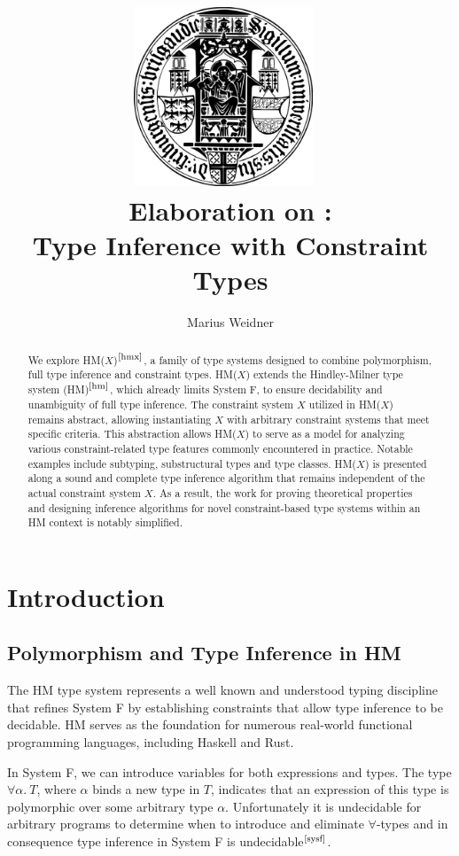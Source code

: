 \documentclass[runningheads]{llncs}
\title{\includegraphics[width=0.4\textwidth]{logo.png}~\\[1cm] Elaboration on
  \hmx:\\Type Inference with Constraint Types}
\institute{Chair of Programming Languages, University of Freiburg \\
  \email{weidner@cs.uni-freiburg.de}}
\author{Marius Weidner}
\newcommand{\hmx}{HM($X$)}
\begin{document}
\let\oldaddcontentsline\addcontentsline{}
\def\addcontentsline#1#2#3{}
\maketitle
\def\addcontentsline#1#2#3{\oldaddcontentsline{#1}{#2}{#3}}

\begin{abstract}
  We explore \hmx{}$^\text{\cite{hmx}}$, a family of type systems designed to
  combine
  polymorphism, full type inference and constraint types.
  \hmx{} extends the Hindley-Milner type system (HM)$^\text{\cite{hm}}$, which
  already
  limits
  System F, to ensure decidability and unambiguity of full type inference.
  The constraint system $X$ utilized in \hmx{} remains abstract, allowing
  instantiating $X$ with arbitrary constraint systems that meet specific
  criteria.
  This abstraction allows \hmx{} to serve as a model for analyzing various
  constraint-related type features commonly encountered in practice.
  Notable examples include subtyping, substructural
  types and type classes.
  \hmx{} is presented along a sound and complete type inference algorithm that
  remains
  independent of the actual constraint system
  $X$.
  As a result, the work for proving theoretical properties and designing
  inference algorithms for novel constraint-based type systems within an
  HM context is notably simplified.
\end{abstract}

\setcounter{tocdepth}{2}
\tableofcontents
\newpage

\section{Introduction}

\subsection{Polymorphism and Type Inference in HM}
The HM type system represents a well known and understood typing discipline
that
refines System F by establishing constraints that allow type inference
to be decidable.
HM serves as the foundation for numerous real-world functional programming
languages, including Haskell and Rust.

In System F, we can introduce variables for both expressions and types.
The type $∀α. \ T$, where $α$ binds a new type in $T$,
indicates that an expression of this type is polymorphic over some
arbitrary type $α$.
Unfortunately it is undecidable for arbitrary programs to determine when to
introduce and eliminate $∀$-types and in consequence type inference in System F
is undecidable$^\text{\cite{sysf}}$.
\end{document}
